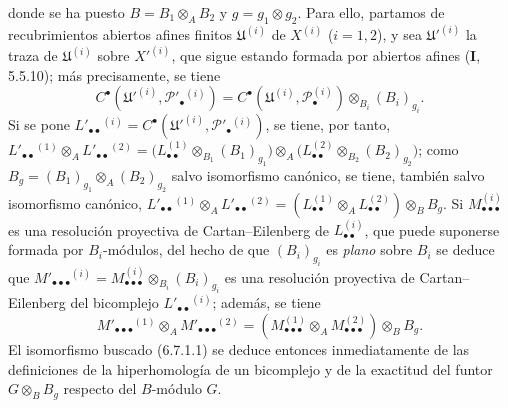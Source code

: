 \begin{env}[6.7.1]
donde se ha puesto $B=B_1\otimes_A B_2$ y $g=g_1\otimes g_2$. Para ello,
partamos de recubrimientos abiertos afines finitos $\mathfrak U^{(i)}$ de
$X^{(i)}$ ($i=1,2$), y sea $\mathfrak U'^{(i)}$ la traza de
$\mathfrak U^{(i)}$ sobre $X'^{(i)}$, que sigue estando formada por abiertos
afines (\textbf I, 5.5.10); más precisamente, se tiene
\[
  C^\bullet(\mathfrak U'^{(i)},\mathscr P'_\bullet{}^{(i)})
  =C^\bullet(\mathfrak U^{(i)},\mathscr P_\bullet^{(i)})
   \otimes_{B_i}(B_i)_{g_i}.
\]
Si se pone
$L'_{\bullet\bullet}{}^{(i)}
=C^\bullet(\mathfrak U'^{(i)},\mathscr P'_\bullet{}^{(i)})$, se tiene, por
tanto,
$
  L'_{\bullet\bullet}{}^{(1)}\otimes_A L'_{\bullet\bullet}{}^{(2)}
  =\bigl(L_{\bullet\bullet}^{(1)}\otimes_{B_1}(B_1)_{g_1}\bigr)
   \otimes_A
   \bigl(L_{\bullet\bullet}^{(2)}\otimes_{B_2}(B_2)_{g_2}\bigr)$;
como $B_g=(B_1)_{g_1}\otimes_A(B_2)_{g_2}$ salvo isomorfismo canónico, se
tiene, también salvo isomorfismo canónico,
$
  L'_{\bullet\bullet}{}^{(1)}\otimes_A L'_{\bullet\bullet}{}^{(2)}
  =(L_{\bullet\bullet}^{(1)}\otimes_A L_{\bullet\bullet}^{(2)})
    \otimes_B B_g$.
Si $M_{\bullet\bullet\bullet}^{(i)}$ es una resolución proyectiva de
Cartan--Eilenberg de $L_{\bullet\bullet}^{(i)}$, que puede suponerse formada
por $B_i$-módulos, del hecho de que $(B_i)_{g_i}$ es \emph{plano} sobre $B_i$
se deduce que
$M'_{\bullet\bullet\bullet}{}^{(i)}
=M_{\bullet\bullet\bullet}^{(i)}\otimes_{B_i}(B_i)_{g_i}$ es una resolución
proyectiva de Cartan--Eilenberg del bicomplejo
$L'_{\bullet\bullet}{}^{(i)}$; además, se tiene
\[
  M'_{\bullet\bullet\bullet}{}^{(1)}\otimes_A M'_{\bullet\bullet\bullet}{}^{(2)}
  =(M_{\bullet\bullet\bullet}^{(1)}\otimes_A M_{\bullet\bullet\bullet}^{(2)})
    \otimes_B B_g.
\]
El isomorfismo buscado (6.7.1.1) se deduce entonces inmediatamente de las
definiciones de la hiperhomología de un bicomplejo y de la exactitud del
funtor $G\otimes_B B_g$ respecto del $B$-módulo $G$.
\end{env}

